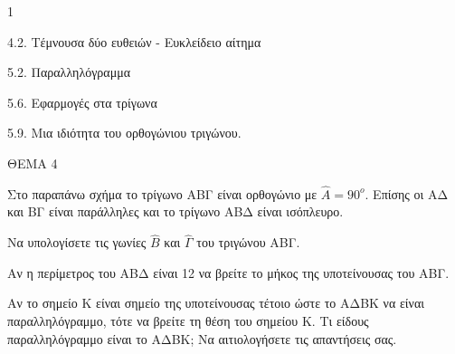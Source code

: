 \begin{ylh}{1}
    \item 4.2. Τέμνουσα δύο ευθειών - Ευκλείδειο αίτημα
    \item 5.2. Παραλληλόγραμμα
    \item 5.6. Εφαρμογές στα τρίγωνα
    \item 5.9. Μια ιδιότητα του ορθογώνιου τριγώνου.
\end{ylh}

ΘΕΜΑ 4



Στο παραπάνω σχήμα το τρίγωνο ΑΒΓ είναι ορθογώνιο με $\widehat{Α} = 90^{ο}$. Επίσης οι ΑΔ και ΒΓ είναι παράλληλες και το τρίγωνο ΑΒΔ είναι ισόπλευρο.

\begin{alist}
\item Να υπολογίσετε τις γωνίες $\widehat{Β}$ και $\widehat{\Gamma}$ του τριγώνου ΑΒΓ.


\item Αν η περίμετρος του ΑΒΔ είναι 12 να βρείτε το μήκος της υποτείνουσας του ΑΒΓ.


\item Αν το σημείο Κ είναι σημείο της υποτείνουσας τέτοιο ώστε το ΑΔΒΚ να είναι παραλληλόγραμμο, τότε να βρείτε τη θέση του σημείου Κ. Τι είδους παραλληλόγραμμο είναι το ΑΔΒΚ; Να αιτιολογήσετε τις απαντήσεις σας.

\end{alist}
